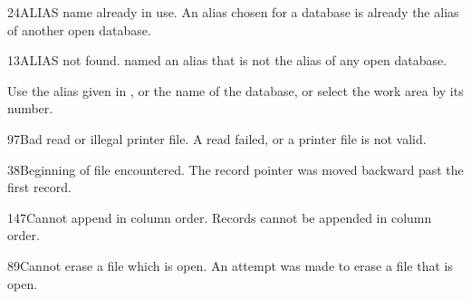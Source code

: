 
\begin{XbaseMessageEntry}{24}{ALIAS name already in use.}
An alias chosen for a database is already the alias of another open database.
\end{XbaseMessageEntry}

\begin{XbaseMessageEntry}{13}{ALIAS not found.}
 named an alias that is not the alias of any open database.

Use the alias given in  , or the name of the database, or select the work area by its number.
\end{XbaseMessageEntry}

\begin{XbaseMessageEntry}{97}{Bad read or illegal printer file.}
A read failed, or a printer file is not valid.
\end{XbaseMessageEntry}

\begin{XbaseMessageEntry}{38}{Beginning of file encountered.}
The record pointer was moved backward past the first record.
\end{XbaseMessageEntry}

\begin{XbaseMessageEntry}{147}{Cannot append in column order.}
Records cannot be appended in column order.
\end{XbaseMessageEntry}

\begin{XbaseMessageEntry}{89}{Cannot erase a file which is open.}
An attempt was made to erase a file that is open.
\end{XbaseMessageEntry}

